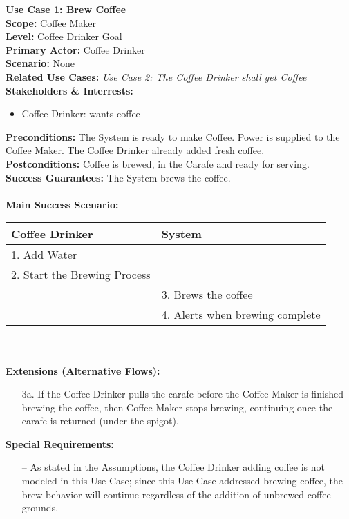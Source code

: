 \documentclass[letterpaper]{article}
\begin{document}
\noindent
\textbf{Use Case 1: Brew Coffee}\\
\textbf{Scope: }Coffee Maker\\
\textbf{Level: }Coffee Drinker Goal\\
\textbf{Primary Actor: }Coffee Drinker\\
\textbf{Scenario: }None\\
\textbf{Related Use Cases: }\textit{Use Case 2:  The Coffee Drinker
shall get Coffee}\\
\textbf{Stakeholders \& Interrests: }
\begin{itemize}
\item Coffee Drinker: wants coffee
\end{itemize}
\textbf{Preconditions: }The System is ready to make Coffee.  Power is
supplied to the Coffee Maker.  The Coffee Drinker already added fresh
coffee.\\
\textbf{Postconditions: }Coffee is brewed, in the Carafe and ready for
serving.\\
\textbf{Success Guarantees: }The System brews the coffee.\\\\
\textbf{Main Success Scenario: }\\
\begin{tabular}{|p{5.75cm}|p{5.75cm}|}\hline
\textbf{Coffee Drinker} & \textbf{System}\\\hline
1.  Add Water & \\\hline
2.  Start the Brewing Process &\\\hline
& 3. Brews the coffee\\\hline
& 4. Alerts when brewing complete\\\hline
\end{tabular}\\\\
\textbf{Extensions (Alternative Flows): }
\begin{itemize}
\item[3a.]
If the Coffee Drinker pulls the carafe before the Coffee Maker
is finished brewing the coffee, then Coffee Maker stops brewing,
continuing once the carafe is returned (under the spigot).
\end{itemize}
\textbf{Special Requirements:  }
\begin{itemize}
\item [--]As stated in the Assumptions, the Coffee Drinker adding
coffee
is not modeled in this Use Case; since this Use Case addressed brewing
coffee, the brew behavior will continue regardless of the addition of
unbrewed coffee grounds.
\end{itemize}
\end{document}
